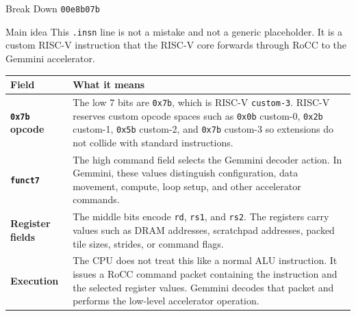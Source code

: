 \documentclass[aspectratio=169,10pt]{beamer}
\newcommand{\code}[1]{\texttt{\footnotesize #1}}
\newcommand{\edgeword}[1]{\textcolor{red!75!black}{\textbf{#1}}}
\begin{document}
\begin{frame}{Break Down \code{00e8b07b}}
  \scriptsize
  \begin{block}{Main idea}
    This \code{.insn} line is not a mistake and not a generic placeholder. It is a custom RISC-V instruction that the RISC-V core forwards through RoCC to the Gemmini accelerator.
  \end{block}

  \vspace{0.25em}
  \begin{tabularx}{\textwidth}{@{}lX@{}}
    \toprule
    Field & What it means \\
    \midrule
    \edgeword{\code{0x7b} opcode} &
      The low 7 bits are \code{0x7b}, which is RISC-V \code{custom-3}. RISC-V reserves custom opcode spaces such as \code{0x0b} custom-0, \code{0x2b} custom-1, \code{0x5b} custom-2, and \code{0x7b} custom-3 so extensions do not collide with standard instructions. \\
    \edgeword{\code{funct7}} &
      The high command field selects the Gemmini decoder action. In Gemmini, these values distinguish configuration, data movement, compute, loop setup, and other accelerator commands. \\
    \edgeword{Register fields} &
      The middle bits encode \code{rd}, \code{rs1}, and \code{rs2}. The registers carry values such as DRAM addresses, scratchpad addresses, packed tile sizes, strides, or command flags. \\
    \edgeword{Execution} &
      The CPU does not treat this like a normal ALU instruction. It issues a RoCC command packet containing the instruction and the selected register values. Gemmini decodes that packet and performs the low-level accelerator operation. \\
    \bottomrule
  \end{tabularx}
\end{frame}
\end{document}
